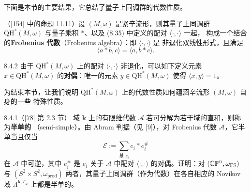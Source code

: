 下面是本节的主要结果，它总结了量子上同调群的代数性质。

（[154] 中的命题 11.11）\quad 设 $(M,\omega)$ 是紧辛流形，则其量子上同调群
$\mathrm{QH}^*(M,\omega)$ 与量子乘积 $*$、以及 (8.35) 中定义的配对 $\langle\cdot,\cdot\rangle$ 一起，
构成一个结合的\textbf{Frobenius 代数}（Frobenius algebra）：即 $\langle\cdot,\cdot\rangle$ 是
非退化双线性形式，且满足
\[
  \langle a*b,c\rangle=\langle a,b*c\rangle.
\]

\begin{wrem}{8.4.2}
  由于 $\mathrm{QH}^*(M,\omega)$ 上的配对 $\langle\cdot,\cdot\rangle$ 非退化，可以如下定义元素
  $x\in\mathrm{QH}^*(M,\omega)$ 的\textbf{对偶}：唯一的元素 $y\in\mathrm{QH}^*(M,\omega)$ 使得
  $\langle x,y\rangle=1$。
\end{wrem}

为结束本节，让我们说明 $\mathrm{QH}^*(M,\omega)$ 上的代数性质如何蕴涵辛流形 $(M,\omega)$ 自身的一些
特殊性质。

\begin{wexer}{8.4.1}（[78] 第 2.3 节）
  域 $\mathbf{k}$ 上的有限维代数 $\mathcal{A}$ 若可分解为若干域的直和，则称为\textbf{半单的}
  （semi-simple）。由 Abram 判据（见 [9]），对 Frobenius 代数 $\mathcal{A}$，它半单当且仅当
  \[
    \mathcal{E}:=\sum_{\text{基 }e_i}e_i*e_i^{\#}
  \]
  在 $\mathcal{A}$ 中可逆，其中 $e_i^{\#}$ 是 $e_i$ 关于 $\mathcal{A}$ 中配对
  $\langle\cdot,\cdot\rangle$ 的对偶。证明：对 $(\mathbb{CP}^n,\omega_{\mathrm{FS}})$ 与
  $(S^2\times S^2,\omega_{\mathrm{prod}})$ 两者，其量子上同调群（作为代数）在各自相应的
  Novikov 域 $\Lambda^{\mathbf{k},\Gamma_\omega}$ 上都是半单的。
\end{wexer}
